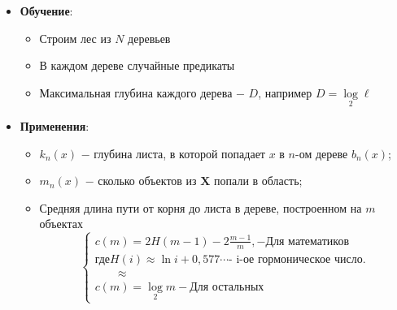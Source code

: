 \begin{itemize}
\begin{itemize}
\begin{enumerate}
                                
                            \end{enumerate}
                    \end{itemize}


                \item \colorbox{blue!20}{\textbf{Обучение}:}

                    \begin{itemize}
                        \item Строим лес из $N$ деревьев

                        \item В каждом дереве случайные предикаты

                        \item Максимальная глубина каждого дерева $-$ $D$, например $D = \log\limits_2 \ell $
                    \end{itemize}

                \item \colorbox{blue!20}{\textbf{Применения}:}

                    \begin{itemize}
                        \item $k_n(x)$ $-$ глубина листа, в которой попадает $x$ в $n$-ом дереве $b_n(x)$;

                        \item $m_n(x)$ $-$ сколько объектов из $\mathbf{X}$ попали в область;

                        \item Средняя длина пути от корня до листа в дереве, построенном на $m$ объектах
                        \begin{equation}
                            \begin{cases}
                                c(m) = 2H(m-1) - 2 \frac{m - 1}{m},  - \textbf{Для математиков}\\
                                \text{где} H(i) \approx \ln{i} + 0,577\cdots \text{- i-ое гормоническое число.}\\

                                \quad\quad \approx \\

                                c(m) = \log\limits_2 m - \textbf{Для остальных}
                            \end{cases}
                        \end{equation}
                         


\end{itemize}
\end{itemize}
